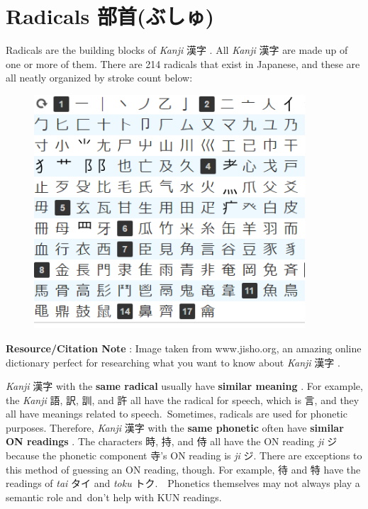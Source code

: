 \section{Radicals 部首(ぶしゅ)}
 
\par{ Radicals are the building blocks of \emph{Kanji }漢字 . All \emph{Kanji }漢字 \emph{ }are made up of one or more of them. There are 214 radicals that exist in Japanese, and these are all neatly organized by stroke count below: }
 
\begin{figure}[h]
\centering

\includegraphics[width=0.9\textwidth]{figs/第01章/第6課:_kanjiintro_fig/Radicals_2.png}

\end{figure}

\par{\textbf{Resource\slash Citation Note }: Image taken from www.jisho.org, an amazing online dictionary perfect for researching what you want to know about \emph{Kanji }漢字 . }

\par{ \emph{Kanji } 漢字 with the \textbf{same radical }usually have \textbf{similar meaning }. For example, the \emph{Kanji }語, 訳, 訓, and 許 all have the radical for speech, which is 言, and they all have meanings related to speech. Sometimes, radicals are used for phonetic purposes. Therefore, \emph{Kanji } 漢字 with the \textbf{same phonetic }often have \textbf{similar ON readings }. The \emph{ }characters  時, 持, and 侍 all have the ON reading \emph{ji }ジ because the phonetic component 寺's ON reading is \emph{ji }ジ. There are exceptions to this method of guessing an ON reading, though. For example, 待 and 特 have the readings of \emph{tai }タイ and \emph{toku }トク.  Phonetics themselves may not always play a semantic role and don't help with KUN readings. }
 
